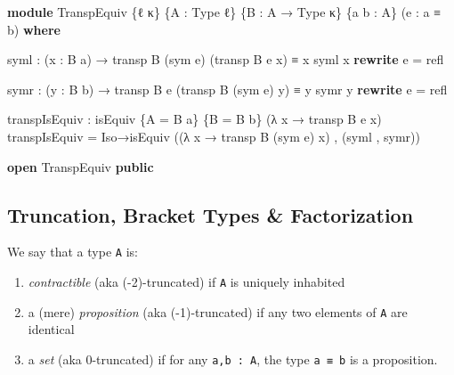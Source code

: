 \documentclass[
  11pt,
  oneside,
  article]{memoir}
\newenvironment{Shaded}{}{}
\newcommand{\KeywordTok}[1]{\textcolor[rgb]{0.00,0.44,0.13}{\textbf{#1}}}
\newcommand{\NormalTok}[1]{#1}
\newcommand{\OtherTok}[1]{\textcolor[rgb]{0.00,0.44,0.13}{#1}}
\providecommand{\tightlist}{%
  \setlength{\itemsep}{0pt}\setlength{\parskip}{0pt}}
\theoremstyle{definition}
\theoremstyle{plain}
\newcommand{\0}{\textsf{0}}
\newcommand{\1}{\tn{\textsf{1}}}
\begin{document}
\begin{Shaded}
\begin{Highlighting}[]
\KeywordTok{module}\NormalTok{ TranspEquiv }\OtherTok{\{}\NormalTok{ℓ κ}\OtherTok{\}} \OtherTok{\{}\NormalTok{A }\OtherTok{:}\NormalTok{ Type ℓ}\OtherTok{\}} \OtherTok{\{}\NormalTok{B }\OtherTok{:}\NormalTok{ A }\OtherTok{→}\NormalTok{ Type κ}\OtherTok{\}} 
                   \OtherTok{\{}\NormalTok{a b }\OtherTok{:}\NormalTok{ A}\OtherTok{\}} \OtherTok{(}\NormalTok{e }\OtherTok{:}\NormalTok{ a ≡ b}\OtherTok{)} \KeywordTok{where}

\NormalTok{    syml }\OtherTok{:} \OtherTok{(}\NormalTok{x }\OtherTok{:}\NormalTok{ B a}\OtherTok{)} \OtherTok{→}\NormalTok{ transp B }\OtherTok{(}\NormalTok{sym e}\OtherTok{)} \OtherTok{(}\NormalTok{transp B e x}\OtherTok{)}\NormalTok{ ≡ x}
\NormalTok{    syml x }\KeywordTok{rewrite}\NormalTok{ e }\OtherTok{=}\NormalTok{ refl}

\NormalTok{    symr }\OtherTok{:} \OtherTok{(}\NormalTok{y }\OtherTok{:}\NormalTok{ B b}\OtherTok{)} \OtherTok{→}\NormalTok{ transp B e }\OtherTok{(}\NormalTok{transp B }\OtherTok{(}\NormalTok{sym e}\OtherTok{)}\NormalTok{ y}\OtherTok{)}\NormalTok{ ≡ y}
\NormalTok{    symr y }\KeywordTok{rewrite}\NormalTok{ e }\OtherTok{=}\NormalTok{ refl}

\NormalTok{    transpIsEquiv }\OtherTok{:}\NormalTok{ isEquiv }\OtherTok{\{}\NormalTok{A }\OtherTok{=}\NormalTok{ B a}\OtherTok{\}} \OtherTok{\{}\NormalTok{B }\OtherTok{=}\NormalTok{ B b}\OtherTok{\}} \OtherTok{(λ}\NormalTok{ x }\OtherTok{→}\NormalTok{ transp B e x}\OtherTok{)}
\NormalTok{    transpIsEquiv }\OtherTok{=} 
\NormalTok{        Iso→isEquiv }\OtherTok{((λ}\NormalTok{ x }\OtherTok{→}\NormalTok{ transp B }\OtherTok{(}\NormalTok{sym e}\OtherTok{)}\NormalTok{ x}\OtherTok{)}\NormalTok{ , }\OtherTok{(}\NormalTok{syml , symr}\OtherTok{))}

\KeywordTok{open}\NormalTok{ TranspEquiv }\KeywordTok{public}
\end{Highlighting}
\end{Shaded}

\subsection{Truncation, Bracket Types \&
Factorization}\label{truncation-bracket-types-factorization}

We say that a type \texttt{A} is:

\begin{enumerate}
\def\labelenumi{\arabic{enumi}.}
\tightlist
\item
  \emph{contractible} (aka (-2)-truncated) if \texttt{A} is uniquely
  inhabited
\item
  a (mere) \emph{proposition} (aka (-1)-truncated) if any two elements
  of \texttt{A} are identical
\item
  a \emph{set} (aka 0-truncated) if for any \texttt{a,b\ :\ A}, the type
  \texttt{a\ ≡\ b} is a proposition.
\end{enumerate}
\end{document}

